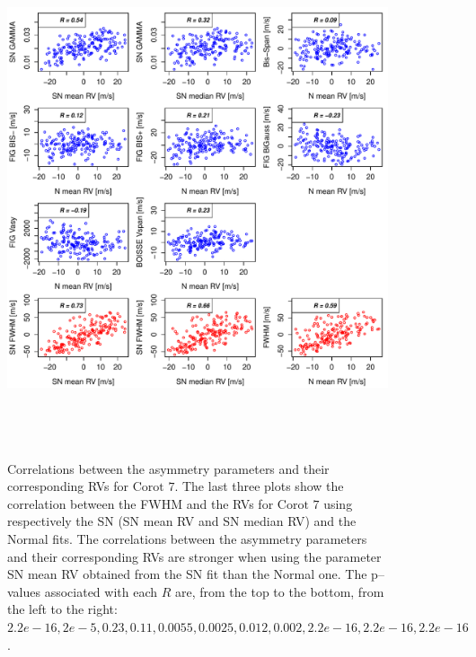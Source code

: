 \documentclass{aa}
\begin{document}
\begin{figure}[htbp]
\begin{center}
\includegraphics[height = 6in]{LRa01_E_[4]Comparison_para.pdf} 
   \caption{Correlations between the asymmetry parameters and their corresponding RVs for $\text{Corot }7$. The last three plots show the correlation between the FWHM and the RVs for $\text{Corot }7$ using respectively the SN (SN mean RV and SN median RV) and the Normal fits. The correlations between the asymmetry parameters and their corresponding RVs are stronger when using the parameter SN mean RV obtained from the SN fit than the Normal one. The p--values associated with each $R$ are, from the top to the bottom, from the left to the right: $2.2e-16,2e-5,0.23,0.11,0.0055,0.0025,0.012,0.002,2.2e-16,2.2e-16,2.2e-16$. }
   \label{fig:Corot7:corrPlot}
\end{center}
\end{figure}
\end{document}
